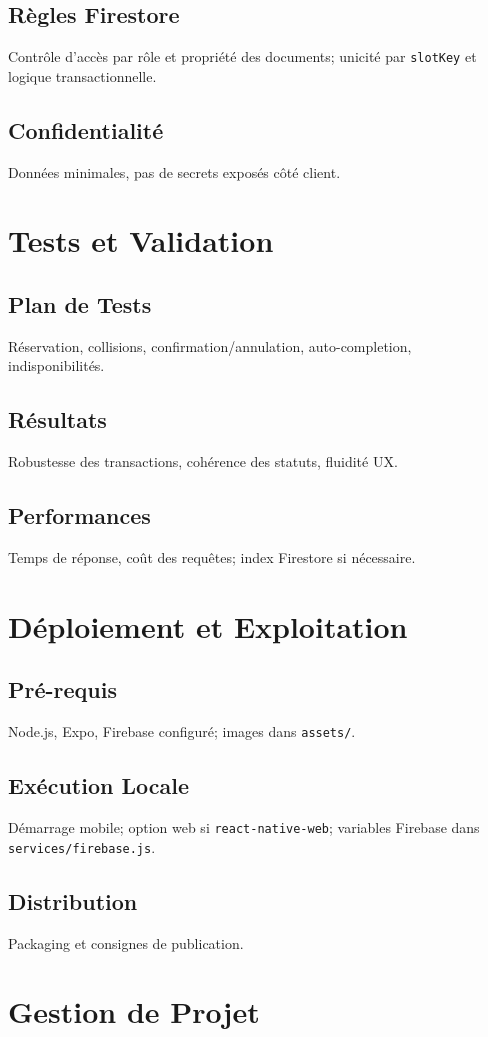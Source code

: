 \documentclass[12pt,a4paper]{report}
\begin{document}
\section{Règles Firestore}
Contrôle d’accès par rôle et propriété des documents; unicité par \texttt{slotKey} et logique transactionnelle.
\section{Confidentialité}
Données minimales, pas de secrets exposés côté client.
\chapter{Tests et Validation}
\section{Plan de Tests}
Réservation, collisions, confirmation/annulation, auto-completion, indisponibilités.
\section{Résultats}
Robustesse des transactions, cohérence des statuts, fluidité UX.
\section{Performances}
Temps de réponse, coût des requêtes; index Firestore si nécessaire.
\chapter{Déploiement et Exploitation}
\section{Pré-requis}
Node.js, Expo, Firebase configuré; images dans \texttt{assets/}.
\section{Exécution Locale}
Démarrage mobile; option web si \texttt{react-native-web}; variables Firebase dans \texttt{services/firebase.js}.
\section{Distribution}
Packaging et consignes de publication.
\chapter{Gestion de Projet}
\end{document}
